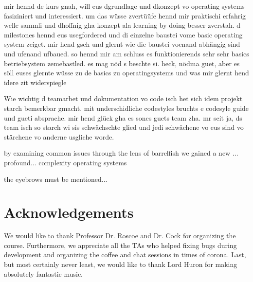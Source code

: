 \documentclass{article}
\begin{document}

mir hennd de kurs gnah, will eus dgrundlage und dkonzept vo operating systems fasiziniert und interessiert. um das wüsse zvertüüfe hennd mir praktischi erfahrig welle sammli und dhoffnig gha konzept ala learning by doing besser zverstah.
d milestones hennd eus usegfordered und di einzelne baustei vome basic operating system zeiget. 
mir hend gseh und glernt wie die baustei voenand abhängig sind und ufenand ufbaued.
so hennd mir am schluss es funktionierends sehr sehr basics betriebsystem zemebastled. 
es mag nöd s beschte si. heck, nödma guet, aber es söll euses glernte wüsse zu de basics zu operatingsystems und was mir glernt hend idere zit widerspiegle

Wie wichtig d teamarbet und dokumentation vo code isch het sich idem projekt starch bemerkbar gmacht. mit underschidliche codestyles bruchts e codesyle guide und gueti absprache. mir hend glück gha es sones guets team zha. mr seit ja, ds team isch so starch wi sis schwächschte glied und jedi schwächene vo eus sind vo stärchene vo anderne usgliche worde. 

by examining common issues through the lens of barrelfish we gained a new ... profound... complexity operating systems

the eyebrows must be mentioned... 
\fi












\section{Acknowledgements}

We would like to thank Professor Dr. Roscoe and Dr. Cock for organizing the course. Furthermore, we appreciate all the TAs who helped fixing bugs during development and organizing the coffee and chat sessions in times of corona. Last, but most certainly never least, we would like to thank Lord Huron for making absolutely fantastic music.

\end{document}
